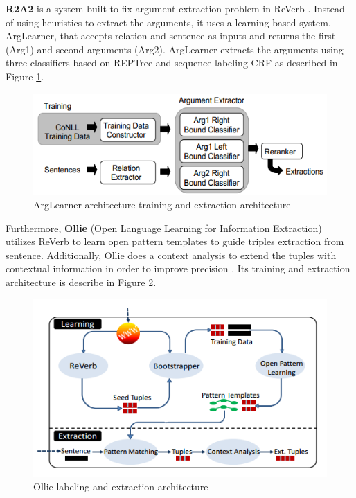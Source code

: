\textbf{R2A2} is a system built to fix argument extraction problem in ReVerb  \citep{etzioni2011open}. Instead of using heuristics to extract the arguments, it uses a learning-based system, ArgLearner, that accepts relation and sentence as inputs and returns the first (Arg1) and second arguments (Arg2). ArgLearner extracts the arguments using three classifiers based on REPTree and sequence labeling CRF as described in Figure \ref{fig_arglearner_architecture}.

\begin{figure}
\centering
\includegraphics[scale=0.5]{../images/arglearner_architecture.png}
\caption{ArgLearner architecture training and extraction architecture}
\label{fig_arglearner_architecture}
\end{figure}

Furthermore, \textbf{Ollie} (Open Language Learning for Information Extraction) \citep{schmitz2012open} utilizes ReVerb \citep{fader2011identifying} to learn open pattern templates to guide triples extraction from sentence. Additionally, Ollie does a context analysis to extend the tuples with contextual information in order to improve precision \citep{schmitz2012open}. Its training and extraction architecture is describe in Figure \ref{fig_ollie_architecture}.

\begin{figure}
\centering
\includegraphics[scale=0.5]{../images/ollie_architecture.png}
\caption{Ollie labeling and extraction architecture}
\label{fig_ollie_architecture}
\end{figure}

